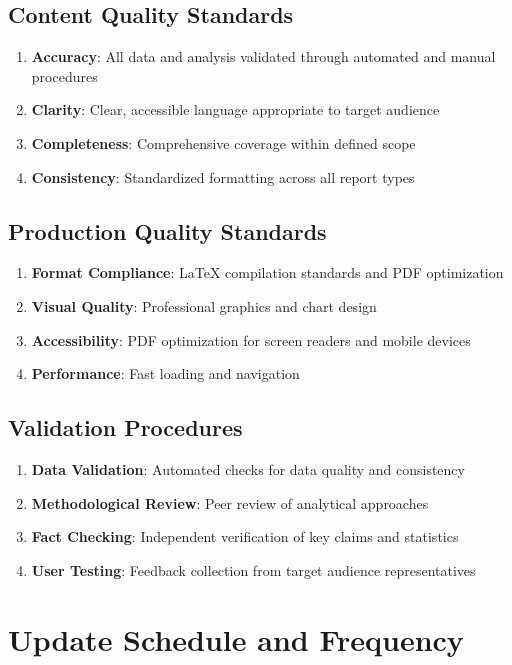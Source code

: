 \documentclass[11pt,a4paper]{article}
\begin{document}
\subsection{Content Quality Standards}
\begin{enumerate}
    \item \textbf{Accuracy}: All data and analysis validated through automated and manual procedures
    \item \textbf{Clarity}: Clear, accessible language appropriate to target audience
    \item \textbf{Completeness}: Comprehensive coverage within defined scope
    \item \textbf{Consistency}: Standardized formatting across all report types
\end{enumerate}

\subsection{Production Quality Standards}
\begin{enumerate}
    \item \textbf{Format Compliance}: LaTeX compilation standards and PDF optimization
    \item \textbf{Visual Quality}: Professional graphics and chart design
    \item \textbf{Accessibility}: PDF optimization for screen readers and mobile devices
    \item \textbf{Performance}: Fast loading and navigation
\end{enumerate}

\subsection{Validation Procedures}
\begin{enumerate}
    \item \textbf{Data Validation}: Automated checks for data quality and consistency
    \item \textbf{Methodological Review}: Peer review of analytical approaches
    \item \textbf{Fact Checking}: Independent verification of key claims and statistics
    \item \textbf{User Testing}: Feedback collection from target audience representatives
\end{enumerate}

\section{Update Schedule and Frequency}
\end{document}
